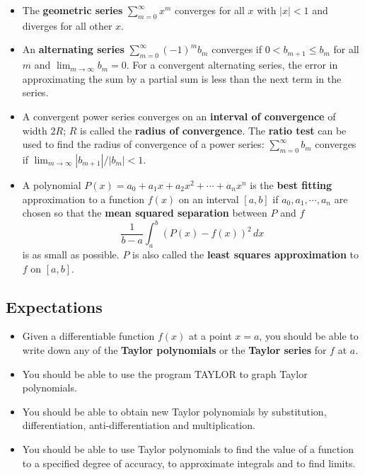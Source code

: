 {{{{\begin{itemize}
\item  The {\bf geometric series} $\sum_{m = 0}^{\infty} x^m$ converges for all $x$ with $|x| < 1$ and diverges for all other $x$.

\item An {\bf alternating series} $\sum_{m=0}^{\infty} (-1)^mb_m$
  converges if $0 < b_{m+1} \leq b_m$ for all $m$ and $\lim_{m \to
    \infty} b_m = 0$.  For a convergent alternating series, the error in
  approximating the sum by a partial sum is less than the next term in
  the series.

\item  A convergent power series converges on an {\bf interval of convergence} of width $2R$; $R$ is called the {\bf radius of convergence}.  The {\bf ratio test} can be used to find the radius of convergence of a power series:  $\sum_{m=0}^{\infty} b_m$ converges if $\lim_{m \to \infty} |b_{m+1}|/|b_m| < 1$.

\item  A polynomial $P(x)=a_0+a_1 x+a_2 x^2 + \cdots + a_n x^n$  is the {\bf best fitting} approximation to a function $f(x)$ on an interval $[a,b]$ if $a_0, a_1, \cdots, a_n$ are chosen so that the {\bf mean squared separation} between $P$ and $f$ 
\[
\frac{1}{b-a} \int_a^b (P(x)-f(x))^2 \, dx
\]
is as small as possible.  $P$ is also called the {\bf least squares approximation} to $f$ on $[a,b]$.


\end{itemize}


\subsection{Expectations}

\begin{itemize}

\item  Given a differentiable function $f(x)$ at a point $x=a$, you should be able to write down any of the {\bf Taylor polynomials} or the {\bf Taylor series} for $f$ at $a$.

\item  You should be able to use the program TAYLOR to graph Taylor polynomials.

\item  You should be able to obtain new Taylor polynomials by substitution, differentiation, anti-differentiation and multiplication.

\item  You should be able to use Taylor polynomials to find the value of a function to a specified degree of accuracy, to approximate integrals and to find limits.


\end{itemize}}}}}
